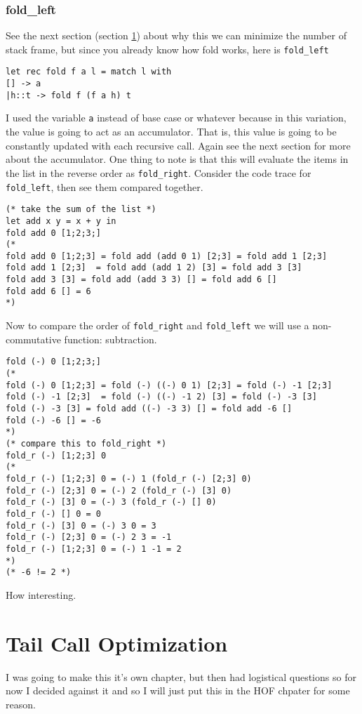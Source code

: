 \documentclass[main.tex]{subfiles}
\begin{document}
\subsubsection{fold\_left}
See the next section (section \ref{sec:tail}) about why this we can minimize the number of stack frame, but since you already know how fold works, here is \texttt{fold\_left}
\begin{lstlisting}[style=Myocamlstyle]
let rec fold f a l = match l with 
[] -> a
|h::t -> fold f (f a h) t
\end{lstlisting}
I used the variable \texttt{a} instead of base case or whatever because in this variation, the value is going to act as an accumulator. That is, this value is going to be constantly updated with each recursive call. Again see the next section for more about the accumulator. 
One thing to note is that this will evaluate the items in the list in the reverse order as \texttt{fold\_right}. 
Consider the code trace for \texttt{fold\_left}, then see them compared together. 
\begin{lstlisting}
(* take the sum of the list *)
let add x y = x + y in 
fold add 0 [1;2;3;]
(*
fold add 0 [1;2;3] = fold add (add 0 1) [2;3] = fold add 1 [2;3] 
fold add 1 [2;3]  = fold add (add 1 2) [3] = fold add 3 [3]
fold add 3 [3] = fold add (add 3 3) [] = fold add 6 []
fold add 6 [] = 6
*)
\end{lstlisting}
Now to compare the order of \texttt{fold\_right} and \texttt{fold\_left} we will use a non-commutative function: subtraction. 
\begin{lstlisting}
fold (-) 0 [1;2;3;]
(*
fold (-) 0 [1;2;3] = fold (-) ((-) 0 1) [2;3] = fold (-) -1 [2;3] 
fold (-) -1 [2;3]  = fold (-) ((-) -1 2) [3] = fold (-) -3 [3]
fold (-) -3 [3] = fold add ((-) -3 3) [] = fold add -6 []
fold (-) -6 [] = -6
*)
(* compare this to fold_right *)
fold_r (-) [1;2;3] 0
(*
fold_r (-) [1;2;3] 0 = (-) 1 (fold_r (-) [2;3] 0)
fold_r (-) [2;3] 0 = (-) 2 (fold_r (-) [3] 0)
fold_r (-) [3] 0 = (-) 3 (fold_r (-) [] 0)
fold_r (-) [] 0 = 0
fold_r (-) [3] 0 = (-) 3 0 = 3
fold_r (-) [2;3] 0 = (-) 2 3 = -1
fold_r (-) [1;2;3] 0 = (-) 1 -1 = 2
*)
(* -6 != 2 *)
\end{lstlisting}
How interesting. 

\section{Tail Call Optimization}\label{sec:tail}

I was going to make this it's own chapter, but then had logistical questions so for now I decided against it and so I will just put this in the HOF chpater for some reason. 
\end{document}
